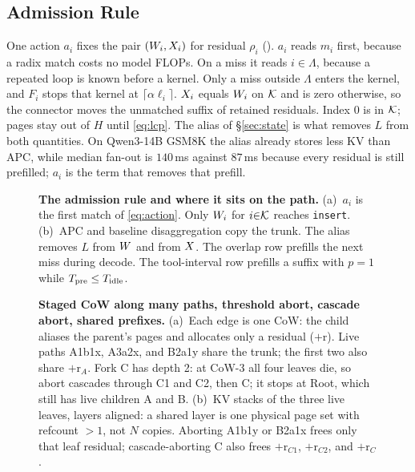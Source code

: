 \subsection{Admission Rule}
\label{sec:app}

One action $a_i$ fixes the pair $(W_i,X_i)$ for residual $\rho_i$ ().
$a_i$ reads $m_i$ first, because a radix match costs no model FLOPs.
On a miss it reads $i{\in}\Lambda$, because a repeated loop is known before a kernel.
Only a miss outside $\Lambda$ enters the kernel, and $F_i$ stops that kernel at $\lceil\alpha\ell_i\rceil$.
$X_i$ equals $W_i$ on $\mathcal{K}$ and is zero otherwise, so the connector moves the unmatched suffix of retained residuals.
Index $0$ is in $\mathcal{K}$; pages stay out of $H$ until \eqref{eq:lcp}.
The alias of \S\ref{sec:state} is what removes $L$ from both quantities.
On Qwen3-14B GSM8K the alias already stores less KV than APC, while median fan-out is $140$\,ms against $87$\,ms because every residual is still prefilled; $a_i$ is the term that removes that prefill.

\begin{figure}[t]
\centering
\resizebox{\textwidth}{!}{}
\caption{\textbf{The admission rule and where it sits on the path.}
(a)~$a_i$ is the first match of \eqref{eq:action}. Only $W_i$ for $i{\in}\mathcal{K}$ reaches \texttt{insert}.
(b)~APC and baseline disaggregation copy the trunk. The alias removes $L$ from $W$ and from $X$.
The overlap row prefills the next miss during decode. The tool-interval row prefills a suffix with $p{=}1$ while $T_{\mathrm{pre}}\le T_{\mathrm{idle}}$.}
\label{fig:app}
\end{figure}

\begin{figure}[t]
\centering
\resizebox{\textwidth}{!}{}
\caption{\textbf{Staged CoW along many paths, threshold abort, cascade abort, shared prefixes.}
(a)~Each edge is one CoW: the child aliases the parent's pages and allocates only a residual ($+$r).
Live paths A1b1x, A3a2x, and B2a1y share the trunk; the first two also share $+$r$_A$.
Fork C has depth 2: at CoW-3 all four leaves die, so abort cascades through C1 and C2, then C; it stops at Root, which still has live children A and B.
(b)~KV stacks of the three live leaves, layers aligned: a shared layer is one physical page set with refcount ${>}1$, not $N$ copies.
Aborting A1b1y or B2a1x frees only that leaf residual; cascade-aborting C also frees $+$r$_{C1}$, $+$r$_{C2}$, and $+$r$_C$.}
\label{fig:tree}
\end{figure}

